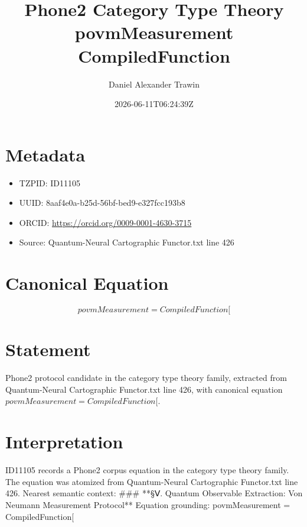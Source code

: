 \documentclass[11pt]{article}
\title{Phone2 Category Type Theory povmMeasurement CompiledFunction}
\author{Daniel Alexander Trawin}
\date{2026-06-11T06:24:39Z}
\begin{document}
\maketitle
\section*{Metadata}
\begin{itemize}
\item TZPID: ID11105
\item UUID: 8aaf4e0a-b25d-56bf-bed9-e327fcc193b8
\item ORCID: \url{https://orcid.org/0009-0001-4630-3715}
\item Source: Quantum-Neural Cartographic Functor.txt line 426
\end{itemize}
\section*{Canonical Equation}
\[
povmMeasurement = CompiledFunction[
\]
\section*{Statement}
Phone2 protocol candidate in the category type theory family, extracted from Quantum-Neural Cartographic Functor.txt line 426, with canonical equation $povmMeasurement = CompiledFunction[$.
\section*{Interpretation}
ID11105 records a Phone2 corpus equation in the category type theory family. The equation was atomized from Quantum-Neural Cartographic Functor.txt line 426. Nearest semantic context: ### **§Ⅴ. Quantum Observable Extraction: Von Neumann Measurement Protocol** Equation grounding: povmMeasurement = CompiledFunction[
\end{document}
